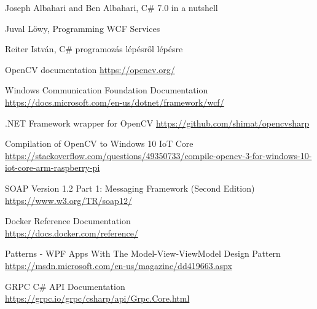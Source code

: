 \begin{thebibliography}{4}

Joseph Albahari and Ben Albahari, C\# 7.0 in a nutshell 

Juval Löwy, Programming WCF Services

 Reiter István, C\# programozás lépésről lépésre 

 OpenCV documentation \url{https://opencv.org/}

 Windows Communication Foundation Documentation \url{https://docs.microsoft.com/en-us/dotnet/framework/wcf/}

 .NET Framework wrapper for OpenCV \url{https://github.com/shimat/opencvsharp}

 Compilation of OpenCV to Windows 10 IoT Core \\ \url{https://stackoverflow.com/questions/49350733/compile-opencv-3-for-windows-10-iot-core-arm-raspberry-pi}

 SOAP Version 1.2 Part 1: Messaging Framework (Second Edition) \\ 
\url{https://www.w3.org/TR/soap12/}

 Docker Reference Documentation \\ \url{https://docs.docker.com/reference/}

 Patterns - WPF Apps With The Model-View-ViewModel Design Pattern \\ \url{https://msdn.microsoft.com/en-us/magazine/dd419663.aspx}

 GRPC C\# API Documentation \\
\url{https://grpc.io/grpc/csharp/api/Grpc.Core.html}
\end{thebibliography}

